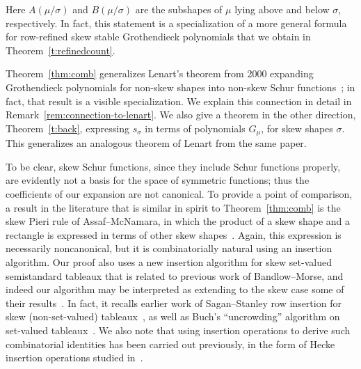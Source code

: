 \noindent Here $A(\mu/\sigma)$ and $B(\mu/\sigma)$ are the subshapes of $\mu$ lying above and below $\sigma$, respectively. In fact, this statement is a specialization of a more general formula for row-refined skew stable Grothendieck polynomials that we obtain in Theorem~\ref{t:refinedcount}. 

Theorem~\ref{thm:comb} generalizes Lenart's theorem from 2000 expanding Grothendieck polynomials for non-skew shapes into non-skew Schur functions~\cite{lenart-combinatorial}; in fact, that result is a visible specialization. We explain this connection in detail in Remark~\ref{rem:connection-to-lenart}. We also give a theorem in the other direction, Theorem~\ref{t:back}, expressing $s_\sigma$ in terms of polynomials $G_\mu$, for skew shapes $\sigma$. This generalizes an analogous theorem of Lenart from the same paper.



To be clear, skew Schur functions, since they include Schur functions properly, are evidently not a basis for the space of symmetric functions; thus the coefficients of our expansion are not canonical. 
To provide a point of comparison, a result in the literature that is similar in spirit to Theorem~\ref{thm:comb} is the skew Pieri rule of Assaf--McNamara, in which the product of a skew shape and a rectangle is expressed in terms of other skew shapes~\cite[Theorem~3.2]{assaf-mcnamara-pieri}. Again, this expression is necessarily noncanonical, but it is combinatorially natural using an insertion algorithm. Our proof also uses a new insertion algorithm for skew set-valued semistandard tableaux that is related to previous work of Bandlow--Morse, and indeed our algorithm may be interpreted as extending to the skew case some of their results~\cite[\S~5]{bandlow-morse-combinatorial}. In fact, it recalls earlier work of Sagan--Stanley row insertion for skew (non-set-valued) tableaux~\cite{sagan-stanley-robinson}, as well as Buch's ``uncrowding'' algorithm on set-valued tableaux~\cite[\S~6]{buch-littlewood-richardson}. We also note that using insertion operations to derive such combinatorial identities has been carried out previously, in the form of Hecke insertion operations studied in~\cite{bksty-stable}.


